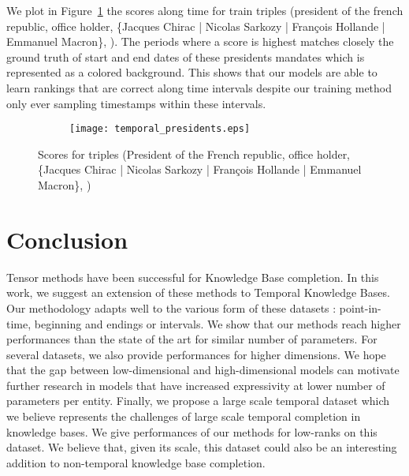 \documentclass{article}
\begin{document}
We plot in Figure~\ref{fig:qualitative} the scores along time for train triples (president of the french republic, office holder, \{Jacques Chirac | Nicolas Sarkozy | François Hollande | Emmanuel Macron\}, ). The periods where a score is highest matches closely the ground truth of start and end dates of these presidents mandates which is represented as a colored background. This shows that our models are able to learn rankings that are correct along time intervals despite our training method only ever sampling timestamps within these intervals.
\vspace{-3mm}
\begin{figure}[t]
    \centering
    \begin{subfigure}[b]{0.7\textwidth}
      \centering \texttt{[image: temporal\_presidents.eps]}
    \end{subfigure}
    \caption{Scores for triples (President of the French republic, office holder, \{Jacques Chirac | Nicolas Sarkozy | François Hollande | Emmanuel Macron\}, )}
    \label{fig:qualitative}
\vspace{-3mm}    
\end{figure}

\section{Conclusion}
Tensor methods have been successful for Knowledge Base completion. In this work, we suggest an extension of these methods to Temporal Knowledge Bases. Our methodology adapts well to the various form of these datasets : point-in-time, beginning and endings or intervals. We show that our methods reach higher performances than the state of the art for similar number of parameters. For several datasets, we also provide performances for higher dimensions. We hope that the gap between low-dimensional and high-dimensional models can motivate further research in models that have increased expressivity at lower number of parameters per entity. Finally, we propose a large scale temporal dataset which we believe represents the challenges of large scale temporal completion in knowledge bases. We give performances of our methods for low-ranks on this dataset. We believe that, given its scale, this dataset could also be an interesting addition to non-temporal knowledge base completion.


\newpage



\clearpage
\end{document}
